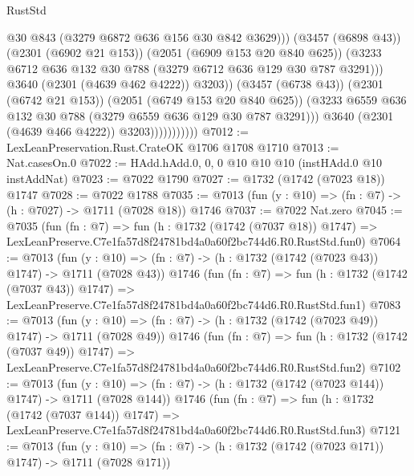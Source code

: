 \begin{lexlean}{RustStd}
\begin{coremodule}
                                      @30
                                      @843
                                      (@3279 @6872 @636 @156 @30 @842 @3629)))
                                  (@3457 (@6898 @43))
                                  (@2301 (@6902 @21 @153))
                                  (@2051 (@6909 @153 @20 @840 @625))
                                  (@3233
                                    @6712
                                    @636
                                    @132
                                    @30
                                    @788
                                    (@3279 @6712 @636 @129 @30 @787 @3291)))
                                @3640
                                (@2301 (@4639 @462 @4222))
                                @3203))
                            (@3457 (@6738 @43))
                            (@2301 (@6742 @21 @153))
                            (@2051 (@6749 @153 @20 @840 @625))
                            (@3233 @6559 @636 @132 @30 @788 (@3279 @6559 @636 @129 @30 @787 @3291)))
                          @3640
                          (@2301 (@4639 @466 @4222))
                          @3203)))))))))))
@7012 := LexLeanPreservation.Rust.CrateOK @1706 @1708 @1710
@7013 := Nat.casesOn.{0}
@7022 := HAdd.hAdd.{0, 0, 0} @10 @10 @10 (instHAdd.{0} @10 instAddNat)
@7023 := @7022 @1790
@7027 := @1732 (@1742 (@7023 @18)) @1747
@7028 := @7022 @1788
@7035 := @7013 (fun (y : @10) => (fn : @7) -> (h : @7027) -> @1711 (@7028 @18)) @1746
@7037 := @7022 Nat.zero
@7045 := @7035
    (fun (fn : @7) =>
    fun (h : @1732 (@1742 (@7037 @18)) @1747) =>
    LexLeanPreserve.C7e1fa57d8f24781bd4a0a60f2bc744d6.R0.RustStd.fun0)
@7064 := @7013
    (fun (y : @10) => (fn : @7) -> (h : @1732 (@1742 (@7023 @43)) @1747) -> @1711 (@7028 @43))
    @1746
    (fun (fn : @7) =>
    fun (h : @1732 (@1742 (@7037 @43)) @1747) =>
    LexLeanPreserve.C7e1fa57d8f24781bd4a0a60f2bc744d6.R0.RustStd.fun1)
@7083 := @7013
    (fun (y : @10) => (fn : @7) -> (h : @1732 (@1742 (@7023 @49)) @1747) -> @1711 (@7028 @49))
    @1746
    (fun (fn : @7) =>
    fun (h : @1732 (@1742 (@7037 @49)) @1747) =>
    LexLeanPreserve.C7e1fa57d8f24781bd4a0a60f2bc744d6.R0.RustStd.fun2)
@7102 := @7013
    (fun (y : @10) => (fn : @7) -> (h : @1732 (@1742 (@7023 @144)) @1747) -> @1711 (@7028 @144))
    @1746
    (fun (fn : @7) =>
    fun (h : @1732 (@1742 (@7037 @144)) @1747) =>
    LexLeanPreserve.C7e1fa57d8f24781bd4a0a60f2bc744d6.R0.RustStd.fun3)
@7121 := @7013
    (fun (y : @10) => (fn : @7) -> (h : @1732 (@1742 (@7023 @171)) @1747) -> @1711 (@7028 @171))

\end{coremodule}
\end{lexlean}
